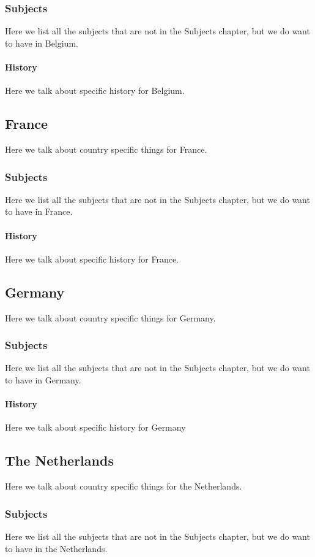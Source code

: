 \documentclass[titlepage]{article}
\begin{document}
\subsubsection{Subjects}
Here we list all the subjects that are not in the Subjects chapter, but we do want to have in Belgium.
\paragraph{History}
Here we talk about specific history for Belgium.

\subsection{France}
Here we talk about country specific things for France.
\subsubsection{Subjects}
Here we list all the subjects that are not in the Subjects chapter, but we do want to have in France.
\paragraph{History}
Here we talk about specific history for France.

\subsection{Germany}
Here we talk about country specific things for Germany.
\subsubsection{Subjects}
Here we list all the subjects that are not in the Subjects chapter, but we do want to have in Germany.
\paragraph{History}
Here we talk about specific history for Germany

\subsection{The Netherlands}
Here we talk about country specific things for the Netherlands.
\subsubsection{Subjects}
Here we list all the subjects that are not in the Subjects chapter, but we do want to have in the Netherlands.
\end{document}
